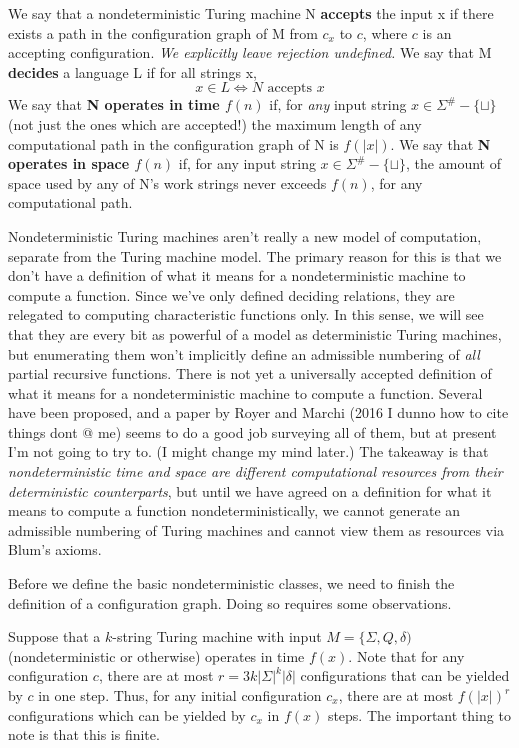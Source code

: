 \begin{definition}
We say that a nondeterministic Turing machine N \textbf{accepts} the input x if there exists a path in the configuration graph of M from $c_x$ to $c$, where $c$ is an accepting configuration. \textit{We explicitly leave rejection undefined.} We say that M \textbf{decides} a language L if for all strings x,
\[x \in L \iff N \textrm{ accepts } x\]
We say that \textbf{N operates in time $f(n)$} if, for \textit{any} input string $x \in \Sigma^\#-\{\sqcup\}$ (not just the ones which are accepted!) the maximum length of any computational path in the configuration graph of N is $f(|x|)$. We say that \textbf{N operates in space $f(n)$} if, for any input string $x \in \Sigma^\#-\{\sqcup\}$, the amount of space used by any of N's work strings never exceeds $f(n)$, for any computational path.
\end{definition}
Nondeterministic Turing machines aren't really a new model of computation, separate from the Turing machine model. The primary reason for this is that we don't have a definition of what it means for a nondeterministic machine to compute a function. Since we've only defined deciding relations, they are relegated to computing characteristic functions only. In this sense, we will see that they are every bit as powerful of a model as deterministic Turing machines, but enumerating them won't implicitly define an admissible numbering of \textit{all} partial recursive functions. There is not yet a universally accepted definition of what it means for a nondeterministic machine to compute a function. Several have been proposed, and a paper by Royer and Marchi (2016 I dunno how to cite things dont @ me) seems to do a good job surveying all of them, but at present I'm not going to try to. (I might change my mind later.) The takeaway is that \textit{nondeterministic time and space are different computational resources from their deterministic counterparts}, but until we have agreed on a definition for what it means to compute a function nondeterministically, we cannot generate an admissible numbering of Turing machines and cannot view them as resources via Blum's axioms.
\par Before we define the basic nondeterministic classes, we need to finish the definition of a configuration graph. Doing so requires some observations.
\par Suppose that a $k$-string Turing machine with input $M = \{\Sigma,Q,\delta)$ (nondeterministic or otherwise) operates in time $f(x)$. Note that for any configuration $c$, there are at most $r=3k|\Sigma|^k|\delta|$ configurations that can be yielded by $c$ in one step. Thus, for any initial configuration $c_x$, there are at most $f(|x|)^r$ configurations which can be yielded by $c_x$ in $f(x)$ steps. The important thing to note is that this is finite. 
